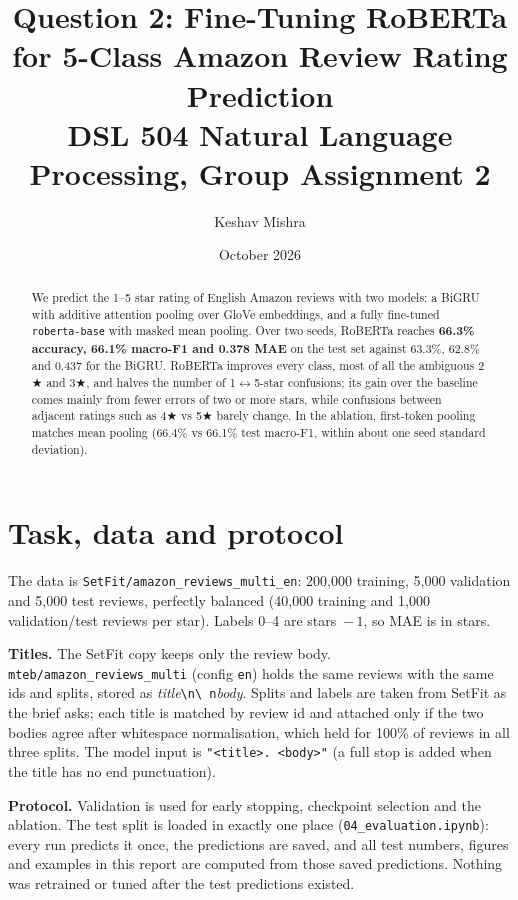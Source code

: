 \documentclass[10pt,a4paper]{article}
\title{\vspace{-1.2cm}\textbf{Question 2: Fine-Tuning RoBERTa for 5-Class Amazon Review Rating Prediction}\\[2pt]
\large DSL 504 Natural Language Processing, Group Assignment 2}
\author{Keshav Mishra}
\date{October 2026}
\newcommand{\st}[1]{#1$\bigstar$}
\newcommand{\code}[1]{\texttt{#1}}
\begin{document}
\maketitle
\vspace{-0.6cm}

\begin{abstract}
\noindent We predict the 1--5 star rating of English Amazon reviews with two models: a BiGRU with additive attention
pooling over GloVe embeddings, and a fully fine-tuned \code{roberta-base} with masked mean pooling. Over two seeds,
RoBERTa reaches \textbf{66.3\% accuracy, 66.1\% macro-F1 and 0.378 MAE} on the test set against 63.3\%, 62.8\% and
0.437 for the BiGRU. RoBERTa improves every class, most of all the ambiguous \st{2} and \st{3}, and halves the
number of 1$\leftrightarrow$5-star confusions; its gain over the baseline comes mainly from fewer errors of two or more
stars, while confusions between adjacent ratings such as \st{4} vs \st{5} barely change. In the ablation,
first-token pooling matches mean pooling (66.4\% vs 66.1\% test macro-F1, within about one seed standard deviation).
\end{abstract}

\section{Task, data and protocol}

The data is \code{SetFit/amazon\_reviews\_multi\_en}: 200{,}000 training, 5{,}000 validation and 5{,}000 test
reviews, perfectly balanced (40{,}000 training and 1{,}000 validation/test reviews per star). Labels 0--4 are
stars~$-\,1$, so MAE is in stars.

\textbf{Titles.} The SetFit copy keeps only the review body. \code{mteb/amazon\_reviews\_multi} (config \code{en})
holds the same reviews with the same ids and splits, stored as \emph{title}\code{\textbackslash n\textbackslash
n}\emph{body}. Splits and labels are taken from SetFit as the brief asks; each title is matched by review id and
attached only if the two bodies agree after whitespace normalisation, which held for 100\% of reviews in all three
splits. The model input is \code{"<title>. <body>"} (a full stop is added when the title has no end punctuation).

\textbf{Protocol.} Validation is used for early stopping, checkpoint selection and the ablation. The test split is
loaded in exactly one place (\code{04\_evaluation.ipynb}): every run predicts it once, the predictions are saved,
and all test numbers, figures and examples in this report are computed from those saved predictions. Nothing was
retrained or tuned after the test predictions existed.
\end{document}
